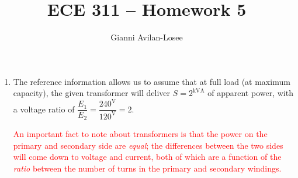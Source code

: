 \documentclass{article}
\title{ECE 311 -- Homework 5}
\author{Gianni Avilan-Losee}
\begin{document}

\begin{enumerate}[label=\thesubsection]
	\setcounter{section}{11}
	\setcounter{subsection}{2}
	\item The reference information allows us to assume that at full load (at maximum capacity), the given transformer will deliver \(S = 2^{\mathrm{kVA}}\) of apparent power, with a voltage ratio of \(\dfrac{E_1}{E_2}=\dfrac{240^{\mathrm{V}}}{120^{\mathrm{V}}} = 2\).

		\textcolor{red}{An important fact to note about transformers is that the power on the primary and secondary side are \textit{equal}; the differences between the two sides will come down to voltage and current, both of which are a function of the \textit{ratio} between the number of turns in the primary and secondary windings.}


\end{enumerate}
\end{document}
